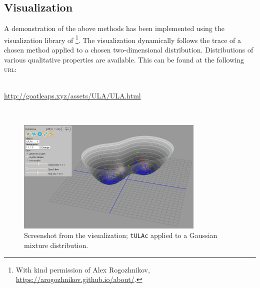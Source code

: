\subsection{Visualization}
A demonstration of the above methods has been implemented using the visualization library of \cite{rogozhnikov2016hmc}\footnote{With kind permission of Alex Rogozhnikov, \url{https://arogozhnikov.github.io/about/}.}. The visualization dynamically follows the trace of a chosen method applied to a chosen two-dimensional distribution. Distributions of various qualitative properties are available. This can be found at the following \textsc{url}: \\
\\
   \centerline{ \url{http://goatleaps.xyz/assets/ULA/ULA.html}}
\\
\begin{figure}[H]
\centering
  \begin{minipage}[b]{0.8\textwidth}
  \centering
    \includegraphics[width=0.8\textwidth]{Figures/ulavis.PNG}
    \caption{Screenshot from the visualization;  \texttt{tULAc} applied to a Gaussian mixture distribution.}
  \end{minipage}
\end{figure}

